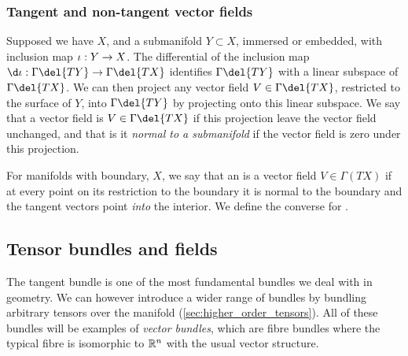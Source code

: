\subsubsection{Tangent and non-tangent vector fields}
Supposed we have \(X\), and a submanifold \(Y\subset X\), immersed or embedded, with inclusion map \(\iota: Y \to X\). 
The differential of the inclusion map \(\d\inclusion: \Gamma\del{TY} \to \Gamma\del{TX}\) identifies \(\Gamma\del{TY}\) with a linear subspace of \(\Gamma\del{TX}\).
We can then project any vector field \(V\in \Gamma\del{TX}\), restricted to the surface of \(Y\), into \(\Gamma\del{TY}\) by projecting onto this linear subspace.
We say that a vector field is \(V\in \Gamma\del{TX}\)  if this projection leave the vector field unchanged, and that is it \emph{normal to a submanifold} if the vector field is zero under this projection.

For manifolds with boundary, \(X\), we say that an  is a vector field \(V\in \Gamma(TX)\) if at every point on its restriction to the boundary it is normal to the boundary and the tangent vectors point \emph{into} the interior. We define the converse for .

\subsection{Tensor bundles and fields}
\label{sec:tensor_bundles_fields}
The tangent bundle is one of the most fundamental bundles we deal with in geometry.
We can however introduce a wider range of bundles by bundling arbitrary tensors over the manifold (\cref{sec:higher_order_tensors}).
All of these bundles will be examples of \emph{vector bundles}, which are fibre bundles where the typical fibre is isomorphic to \(\mathbb{R}^n\) with the usual vector structure.

